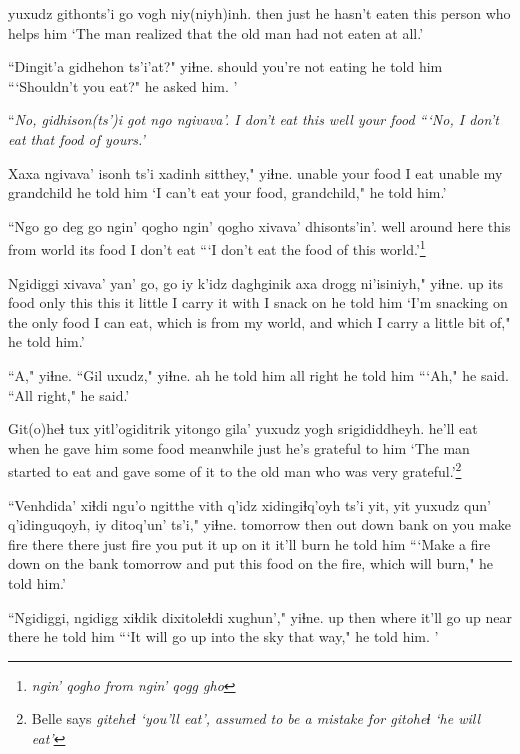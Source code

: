 \documentclass[12pt]{article}
\begin{document}
 yuxudz githonts'i go {vogh niy(niyh)inh.}
then just {he hasn't eaten} this {person who helps him}
\glt `The man realized that the old man had not eaten at all.'
\glend

\gll ``Dingit'a gidhehon ts'i'at?" yiɬne.
should {you're not eating} {} {he told him}
\glt ```Shouldn't you eat?" he asked him. '
\glend

\gll ``\em{No,} gidhison(ts')i got ngo ngivava'. 
{} {I don't eat} this well {your food}
\glt ```No, I don't eat that food of yours.'
\glend

\gll Xaxa ngivava' isonh ts'i xadinh sitthey," yiɬne. 
unable {your food} {I eat} {} unable {my grandchild} {he told him}
\glt `I can't eat your food, grandchild," he told him.' 
\glend

\gll ``Ngo {go deg} go {ngin' qogho} {ngin' qogho} xivava' {dhisonts'in'.} 
well {around here} this {from world} {} {its food} {I don't eat}
\glt ```I don't eat the food of this world.'\footnote{\em ngin' qogho \em from \em ngin' qogg gho}
\glend

\gll Ngidiggi xivava' yan' go, go iy k'idz daghginik axa {drogg ni'isiniyh}," yiɬne.
up {its food} only this this it little {I carry it} with {I snack on} {he told him}
\glt `I'm snacking on the only food I can eat, which is from my world, and which I carry a little bit of," he told him.'
\glend

\gll ``A," yiɬne. {``Gil uxudz,"} yiɬne. 
ah {he told him} {all right} {he told him}
\glt ```Ah," he said. ``All right," he said.'
\glend

\gll Git(o)heɬ tux yitl'ogiditrik yitongo gila' yuxudz {yogh srigididdheyh.} 
{he'll eat} when {he gave him some food} meanwhile {} just {he's grateful to him}
\glt `The man started to eat and gave some of it to the old man who was very grateful.'\footnote{Belle says \em giteheɬ \em `you'll eat', \em assumed to be a mistake for \em gitoheɬ \em `he will eat'}
\glend

\gll ``Venhdida' xiɬdi ngu'o ngitthe {vith q'idz} xidingiɬq'oyh ts'i yit, yit yuxudz qun' q'idinguqoyh, iy ditoq'un' ts'i," yiɬne. 
tomorrow then out down bank on {you make fire} {} there there just fire {you put it up on} it {it'll burn} {} {he told him}
\glt ```Make a fire down on the bank tomorrow and put this food on the fire, which will burn," he told him.'
\glend

\gll ``Ngidiggi, ngidigg xiɬdik dixitoleɬdi xughun'," yiɬne.
up {} then {where it'll go up} {near there} {he told him}
\glt ```It will go up into the sky that way," he told him. '
\glend
\end{document}
